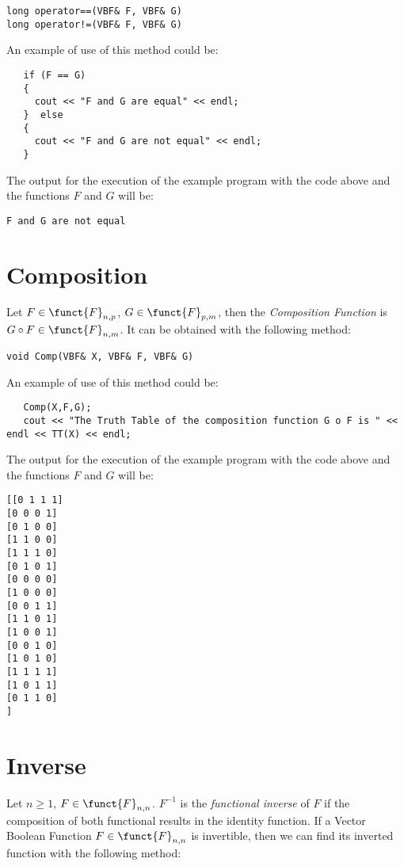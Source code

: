 \begin{verbatim}
long operator==(VBF& F, VBF& G)
long operator!=(VBF& F, VBF& G)
\end{verbatim}

An example of use of this method could be:

\begin{verbatim}
   if (F == G)
   {
     cout << "F and G are equal" << endl;
   }  else
   {
     cout << "F and G are not equal" << endl;
   }
\end{verbatim}

The output for the execution of the example program with the code above and the functions $F$ and $G$ will be:

\begin{verbatim}
F and G are not equal
\end{verbatim}

\section{Composition}

 Let $F \in \funct{F}_{n,p}$, $G \in \funct{F}_{p,m}$, then the \textsl{Composition Function} is $G \circ F \in \funct{F}_{n,m}$. It can be obtained with the following method:

\begin{verbatim}
void Comp(VBF& X, VBF& F, VBF& G)  
\end{verbatim}  

An example of use of this method could be:

\begin{verbatim}
   Comp(X,F,G);
   cout << "The Truth Table of the composition function G o F is " << endl << TT(X) << endl;
\end{verbatim}

The output for the execution of the example program with the code above and the functions $F$ and $G$ will be:

\begin{verbatim}
[[0 1 1 1]
[0 0 0 1]
[0 1 0 0]
[1 1 0 0]
[1 1 1 0]
[0 1 0 1]
[0 0 0 0]
[1 0 0 0]
[0 0 1 1]
[1 1 0 1]
[1 0 0 1]
[0 0 1 0]
[1 0 1 0]
[1 1 1 1]
[1 0 1 1]
[0 1 1 0]
]
\end{verbatim}

\section{Inverse}

Let $n \geq 1$, $F \in \funct{F}_{n,n}$. $F^{-1}$ is the \textsl{functional
  inverse} of $F$ if the composition of both functional results in the identity function. If a Vector Boolean Function $F \in \funct{F}_{n,n}$ is invertible, then we can find its inverted function with the following method:

